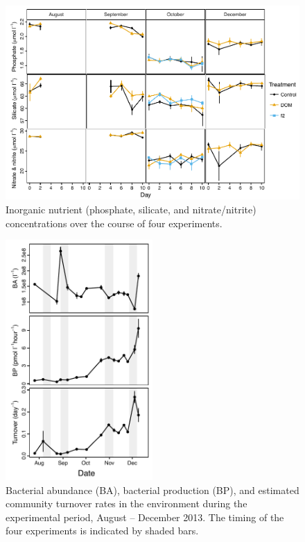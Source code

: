 \begin{figure}[ht!] 
\centering 
\includegraphics[width=\textwidth]{Chapter_4_DOM/Figures/Supplemental_Figure_3_Nutrients}
\caption[Inorganic nutrient (phosphate, silicate, and nitrate/nitrite) concentrations over the course of four experiments.]{Inorganic nutrient (phosphate, silicate, and nitrate/nitrite) concentrations over the course of four experiments.} 
\label{fig:ch3:nutrients} 
\end{figure}

\begin{figure}[ht!] 
\centering 
\includegraphics[width=0.5\textwidth]{Chapter_4_DOM/Figures/Figure_1_environment_BA_BP_turnover}
\caption[Bacterial abundance, bacterial production, and estimated community turnover rates in the environment during the experimental period, August – December 2013.]{Bacterial abundance (BA), bacterial production (BP), and estimated community turnover rates in the environment during the experimental period, August – December 2013. The timing of the four experiments is indicated by shaded bars.} 
\label{fig:ch3:environment_BA_BP_turnover} 
\end{figure}


